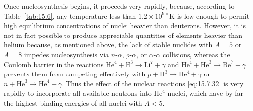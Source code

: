 Once nucleosynthesis begins, it proceeds very rapidly, because, according to
Table~\ref{tab:15.6}, any temperature less than
\(1.2\times10^{9\,\circ}\mathrm K\) is low enough to permit high equilibrium
concentrations of nuclei heavier than deuterons. However, it is not in fact
possible to produce appreciable quantities of elements heavier than helium
because, as mentioned above, the lack of stable nuclides with \(A=5\) or
\(A=8\) impedes nucleosynthesis via \(n\)-\(\alpha\),
\(p\)-\(\alpha\), or \(\alpha\)-\(\alpha\) collisions, whereas the Coulomb
barrier in the reactions
\(\mathrm{He}^4+\mathrm H^3\to\mathrm{Li}^7+\gamma\) and
\(\mathrm{He}^4+\mathrm{He}^3\to\mathrm{Be}^7+\gamma\) prevents them from
competing effectively with
\(p+\mathrm H^3\to\mathrm{He}^4+\gamma\) or
\(n+\mathrm{He}^3\to\mathrm{He}^4+\gamma\). Thus the effect of the nuclear
reactions \eqref{eq:15.7.32} is very rapidly to incorporate all available
neutrons into \(\mathrm{He}^4\) nuclei, which have by far the highest
binding energies of all nuclei with \(A<5\).


